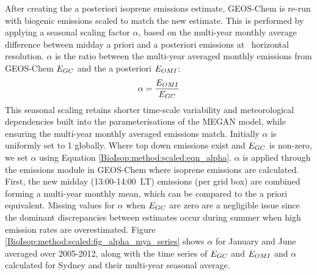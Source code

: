     After creating the a posteriori isoprene emissions estimate, GEOS-Chem is re-run with biogenic emissions scaled to match the new estimate. 
    This is performed by applying a seasonal scaling factor $\alpha$, based on the multi-year monthly average difference between midday a priori and a posteriori emissions at \lowhr ~horizontal resolution.
    $\alpha$ is the ratio between the multi-year averaged monthly emissions from GEOS-Chem $E_{GC}$ and the a posteriori $E_{OMI}$: 
    \begin{equation} \label{BioIsop:method:scaled:eqn_alpha}
        \alpha = \frac{E_{OMI}}{E_{GC}}
    \end{equation}
    This seasonal scaling retains shorter time-scale variability and meteorological dependencies built into the parameterisations of the MEGAN model, while ensuring the multi-year monthly averaged emissions match.
    Initially $\alpha$ is uniformly set to 1 globally.
    Where top down emissions exist and $E_{GC}$ is non-zero, we set $\alpha$ using Equation \ref{BioIsop:method:scaled:eqn_alpha}.
    $\alpha$ is applied through the emissions module in GEOS-Chem where isoprene emissions are calculated.
    First, the new midday (13:00-14:00~LT) emissions (per grid box) are combined forming a multi-year monthly mean, which can be compared to the a priori equivalent.
    Missing values for $\alpha$ when $E_{GC}$ are zero are a negligible issue since the dominant discrepancies between estimates occur during summer when high emission rates are overestimated.
    Figure \ref{BioIsop:method:scaled:fig_alpha_mya_series} shows $\alpha$ for January and June averaged over 2005-2012, along with the time series of $E_{GC}$ and $E_{OMI}$ and $\alpha$ calculated for Sydney and their multi-year seasonal average.
    
    
